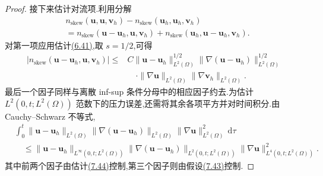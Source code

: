 \begin{proof}
接下来估计对流项.利用分解
\begin{equation}\label{eq:time-dependent-pressure-error-convection-splitting}
\begin{aligned}
  &n_{\mathrm{skew}}(\bm{u},\bm{u},\bm{v}_h)
   -n_{\mathrm{skew}}(\bm{u}_h,\bm{u}_h,\bm{v}_h)\\
  &=n_{\mathrm{skew}}(\bm{u}-\bm{u}_h,\bm{u},\bm{v}_h)
   +n_{\mathrm{skew}}(\bm{u}_h,\bm{u}-\bm{u}_h,\bm{v}_h).
\end{aligned}
\end{equation}
对第一项应用估计\hyperref[eq:steady-ns-conv-estimate-41]{(6.41)},取 $s=1/2$,可得
\begin{equation}\label{eq:time-dependent-pressure-error-convection-bound-1}
\begin{aligned}
  |n_{\mathrm{skew}}(\bm{u}-\bm{u}_h,\bm{u},\bm{v}_h)|
  \le{}&C\|\bm{u}-\bm{u}_h\|_{L^2(\Omega)}^{1/2}
       \|\nabla(\bm{u}-\bm{u}_h)\|_{L^2(\Omega)}^{1/2}\\
  &\quad\cdot\|\nabla\bm{u}\|_{L^2(\Omega)}
       \|\nabla\bm{v}_h\|_{L^2(\Omega)}.
\end{aligned}
\end{equation}
最后一个因子同样与离散 inf-sup 条件分母中的相应因子约去.为估计 $L^2(0,t;L^2(\Omega))$ 范数下的压力误差,还需将其余各项平方并对时间积分.由 Cauchy--Schwarz 不等式,
\[
\begin{aligned}
  &\int_0^t
       \|\bm{u}-\bm{u}_h\|_{L^2(\Omega)}
       \|\nabla(\bm{u}-\bm{u}_h)\|_{L^2(\Omega)}
       \|\nabla\bm{u}\|_{L^2(\Omega)}^2\,\mathrm{d}\tau\\
  &\quad\le
       \|\bm{u}-\bm{u}_h\|_{L^\infty(0,t;L^2(\Omega))}
       \|\nabla(\bm{u}-\bm{u}_h)\|_{L^2(0,t;L^2(\Omega))}
       \|\nabla\bm{u}\|_{L^4(0,t;L^2(\Omega))}^2.
\end{aligned}
\]
其中前两个因子由估计\hyperref[eq:time-dependent-fem-velocity-error]{(7.44)}控制,第三个因子则由假设\hyperref[eq:time-dependent-fem-error-regularity]{(7.43)}控制.


\end{proof}
